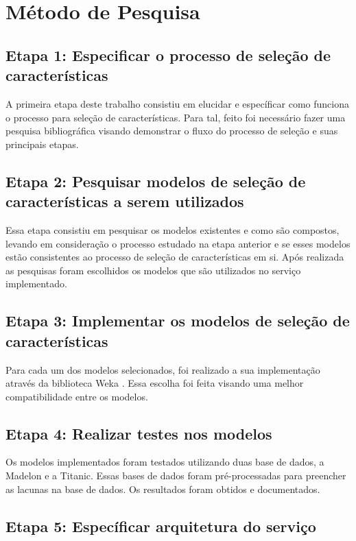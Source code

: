 \section{Método de Pesquisa}

\subsection{Etapa 1: Especificar o processo de seleção de características}

A primeira etapa deste trabalho consistiu em elucidar e específicar como funciona o processo para seleção de características. Para tal, feito foi necessário fazer uma pesquisa bibliográfica visando demonstrar o fluxo do processo de seleção e suas principais etapas.

\subsection{Etapa 2: Pesquisar modelos de seleção de características a serem utilizados}

Essa etapa consistiu em pesquisar os modelos existentes e como são compostos, levando em consideração o processo estudado na etapa anterior e se esses modelos estão consistentes ao processo de seleção de características em si. Após realizada as pesquisas foram escolhidos os modelos que são utilizados no serviço implementado.

\subsection{Etapa 3: Implementar os modelos de seleção de características}

Para cada um dos modelos selecionados, foi realizado a sua implementação através da biblioteca Weka \cite{weka_2005}. Essa escolha foi feita visando uma melhor compatibilidade entre os modelos.

\subsection{Etapa 4: Realizar testes nos modelos}

Os modelos implementados foram testados utilizando duas base de dados, a Madelon \cite{madelon_2003} e a Titanic. Essas bases de dados foram pré-processadas para preencher as lacunas na base de dados. Os resultados foram obtidos e documentados.

\subsection{Etapa 5: Específicar arquitetura do serviço}

